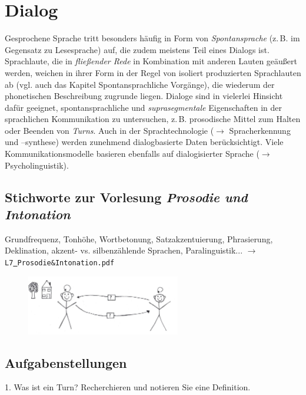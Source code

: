 \documentclass[11pt]{book}
\begin{document}
\chapter{Dialog}
Gesprochene Sprache tritt besonders häufig in Form von \textit{Spontansprache} (z.\,B. im Gegensatz zu Lesesprache) auf, die zudem meistens Teil eines Dialogs ist. Sprachlaute, die in \textit{fließender Rede} in Kombination mit anderen Lauten geäußert werden, weichen in ihrer Form in der Regel von isoliert produzierten Sprachlauten ab (vgl. auch das Kapitel Spontansprachliche Vorgänge), die wiederum der phonetischen Beschreibung zugrunde liegen. Dialoge sind in vielerlei Hinsicht dafür geeignet, spontansprachliche und \textit{suprasegmentale} Eigenschaften in der sprachlichen Kommunikation zu untersuchen, z.\,B. prosodische Mittel zum Halten oder Beenden von \textit{Turns}. Auch in der Sprachtechnologie ($\rightarrow$ Spracherkennung und –synthese) werden zunehmend dialogbasierte Daten berücksichtigt. Viele Kommunikationsmodelle basieren ebenfalls auf dialogisierter Sprache ($\rightarrow$ Psycholinguistik).

\section{Stichworte zur Vorlesung \em{Prosodie und Intonation}}
Grundfrequenz, Tonhöhe, Wortbetonung, Satzakzentuierung, Phrasierung, Deklination, akzent- vs. silbenzählende Sprachen, Paralinguistik... $\rightarrow$ {\tt L7\underline{\ }Prosodie{\&}Intonation.pdf}

\begin{figure}[htbp]
\begin{center}
\includegraphics[width=0.6\textwidth]{grafiken/dialog/dialog}
\label{t5}
\end{center}
\end{figure}


\newpage
\section{Aufgabenstellungen}
1.	Was ist ein Turn? Recherchieren und notieren Sie eine Definition.
\vspace*{3cm}\\
\end{document}
